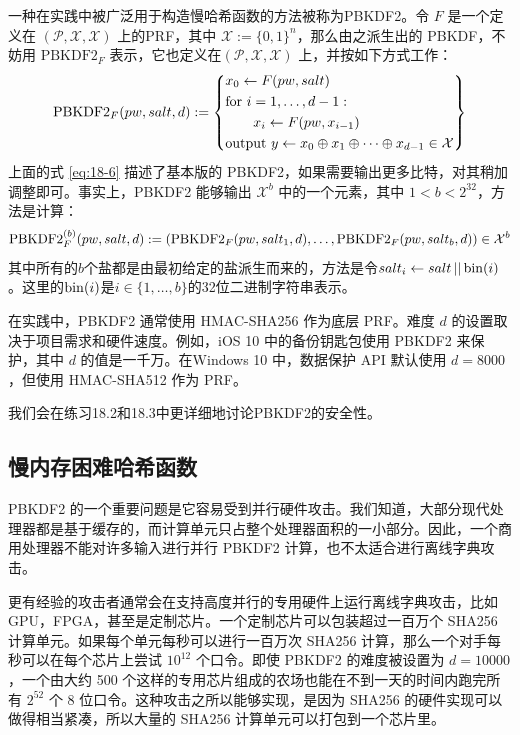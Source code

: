 一种在实践中被广泛用于构造慢哈希函数的方法被称为PBKDF2。令 $F$ 是一个定义在 $(\mathcal{P},\mathcal{X},\mathcal{X})$ 上的PRF，其中 $\mathcal{X}:=\{0,1\}^n$，那么由之派生出的 PBKDF，不妨用 $\text{PBKDF2}_F$ 表示，它也定义在$(\mathcal{P},\mathcal{X},\mathcal{X})$ 上，并按如下方式工作：
\begin{equation}\label{eq:18-6}
	{\rm PBKDF2}_F(pw,salt,d):=
	\left\{
	\begin{aligned}
		& x_0\leftarrow F(pw, salt)\\
		& \text{for }i=1,\dots,d-1:\\
		& ~~~~~~x_i\leftarrow F(pw,x_{i-1})\\
		& \text{output }y\leftarrow x_0 \oplus x_1 \oplus \cdots \oplus x_{d-1}\in\mathcal{X}
	\end{aligned}
	\right\}
\end{equation}
上面的式 \ref{eq:18-6} 描述了基本版的 PBKDF2，如果需要输出更多比特，对其稍加调整即可。事实上，PBKDF2 能够输出 $\mathcal{X}^b$ 中的一个元素，其中 $1<b<2^{32}$，方法是计算：
\begin{equation}\label{eq:18-7}
{\rm PBKDF2}_F^{(b)}(pw,salt,d):=
\left(
{\rm PBKDF2}_F(pw,salt_1,d),\dots,
{\rm PBKDF2}_F(pw,salt_b,d)
\right)
\in\mathcal{X}^b
\end{equation}
其中所有的$b$个盐都是由最初给定的盐派生而来的，方法是令$salt_i\leftarrow salt\,||\,{\rm bin}(i)$。这里的${\rm bin}(i)$是$i\in\{1,\dots,b\}$的32位二进制字符串表示。

在实践中，PBKDF2 通常使用 HMAC-SHA256 作为底层 PRF。难度 $d$ 的设置取决于项目需求和硬件速度。例如，iOS 10 中的备份钥匙包使用 PBKDF2 来保护，其中 $d$ 的值是一千万。在Windows 10 中，数据保护 API 默认使用 $d = 8000$，但使用 HMAC-SHA512 作为 PRF。

我们会在练习18.2和18.3中更详细地讨论PBKDF2的安全性。

\subsection{慢内存困难哈希函数}

PBKDF2 的一个重要问题是它容易受到并行硬件攻击。我们知道，大部分现代处理器都是基于缓存的，而计算单元只占整个处理器面积的一小部分。因此，一个商用处理器不能对许多输入进行并行 PBKDF2 计算，也不太适合进行离线字典攻击。

更有经验的攻击者通常会在支持高度并行的专用硬件上运行离线字典攻击，比如 GPU，FPGA，甚至是定制芯片。一个定制芯片可以包装超过一百万个 SHA256 计算单元。如果每个单元每秒可以进行一百万次 SHA256 计算，那么一个对手每秒可以在每个芯片上尝试 $10^{12}$ 个口令。即使 PBKDF2 的难度被设置为 $d=10000$，一个由大约 500 个这样的专用芯片组成的农场也能在不到一天的时间内跑完所有 $2^{52}$ 个 8 位口令。这种攻击之所以能够实现，是因为 SHA256 的硬件实现可以做得相当紧凑，所以大量的 SHA256 计算单元可以打包到一个芯片里。

